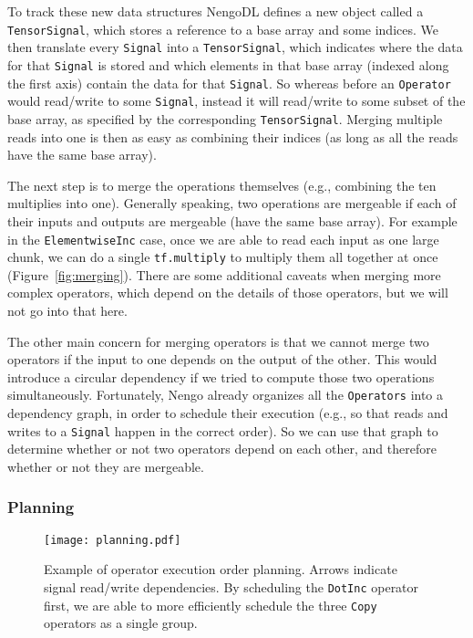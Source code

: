 \documentclass{article}
\begin{document}
To track these new data structures NengoDL defines a new object called a \texttt{TensorSignal}, which stores a reference to a base array and some indices.  We then translate every \texttt{Signal} into a \texttt{TensorSignal}, which indicates where the data for that \texttt{Signal} is stored and which elements in that base array (indexed along the first axis) contain the data for that \texttt{Signal}.  So whereas before an \texttt{Operator} would read/write to some \texttt{Signal}, instead it will read/write to some subset of the base array, as specified by the corresponding \texttt{TensorSignal}.  Merging multiple reads into one is then as easy as combining their indices (as long as all the reads have the same base array).

The next step is to merge the operations themselves (e.g., combining the ten multiplies into one).  Generally speaking, two operations are mergeable if each of their inputs and outputs are mergeable (have the same base array).  For example in the \texttt{ElementwiseInc} case, once we are able to read each input as one large chunk, we can do a single \texttt{tf.multiply} to multiply them all together at once (Figure~\ref{fig:merging}).  There are some additional caveats when merging more complex operators, which depend on the details of those operators, but we will not go into that here.

The other main concern for merging operators is that we cannot merge two operators if the input to one depends on the output of the other.  This would introduce a circular dependency if we tried to compute those two operations simultaneously.  Fortunately, Nengo already organizes all the \texttt{Operators} into a dependency graph, in order to schedule their execution (e.g., so that reads and writes to a \texttt{Signal} happen in the correct order).  So we can use that graph to determine whether or not two operators depend on each other, and therefore whether or not they are mergeable.

\subsubsection{Planning}
\label{sec:planning}

\begin{figure}
\centering
\texttt{[image: planning.pdf]}
\caption{Example of operator execution order planning.  Arrows indicate signal read/write dependencies.  By scheduling the \texttt{DotInc} operator first, we are able to more efficiently schedule the three \texttt{Copy} operators as a single group.}
\label{fig:planning}
\end{figure}
\end{document}
